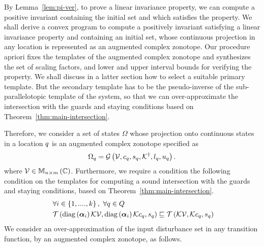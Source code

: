 By Lemma~\ref{lem:pi-ver}, to prove a linear invariance property, we
can compute a positive invariant containing the initial set and which
satisfies the property.  We shall derive a convex program to compute a
positively invariant satisfying a linear invariance property and
containing an initial set, whose continuous projection in any location
is represented as an augmented complex zonotope.  Our procedure
apriori fixes the templates of the augmented complex zonotope and
synthesizes the set of scaling factors, and lower and upper interval
bounds for verifying the property.  We shall discuss in a latter
section how to select a suitable primary template.  But the secondary
template has to be the pseudo-inverse of the sub-parallelotopic
template of the system, so that we can over-approximate the
intersection with the guards and staying conditions based on
Theorem~\ref{thm:main-intersection}.

Therefore, we consider a set of states $\Omega$ whose projection onto
continuous states in a location $q$ is an augmented complex
zonotope specified as
%
\[
\Omega_q=\mathcal{G}\left(\mathcal{V},c_q,s_q,{\mathcal{K}}^\dagger,l_q,u_q\right).
\]
%
where $\mathcal{V}\in\mathbb{M}_{n\times m}\left(\mathbb{C}\right)$.  Furthermore, we require a
condition the following condition on the templates for computing a
sound intersection with the guards and staying conditions, based on
Theorem~\ref{thm:main-intersection}.
%
\begin{equation}~\label{eqn:boxcenter}
\begin{split}
 & \forall
 i\in\left\{1,....,k\right\},~\forall q\in Q\\
 & \mathit{\operatorname{\mathcal{T}}}\left(\operatorname{diag}\left(\bm{\alpha}_{i}\right)\mathcal{K}\mathcal{V},\operatorname{diag}\left(\bm{\alpha}_{i}\right)\mathcal{K}c_q,s_q\right)\sqsubseteq\mathit{\operatorname{\mathcal{T}}}\left(\mathcal{K}\mathcal{V},\mathcal{K}c_q,s_q\right)
 \end{split}
\end{equation}
%
We consider an
over-approximation of the input
disturbance set in any transition function, by an
augmented complex zonotope, as follows.

